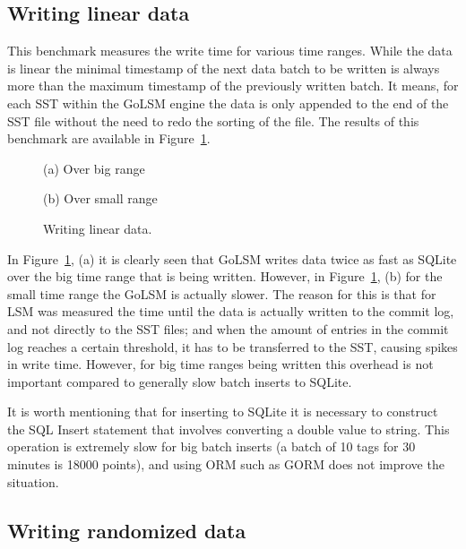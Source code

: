 \subsection{Writing linear data}

This benchmark measures the write time for various time ranges. While the data is linear the minimal timestamp of the next data batch to be written is always more than the maximum timestamp of the previously written batch. It means, for each SST within the GoLSM engine the data is only appended to the end of the SST file without the need to redo the sorting of the file. The results of this benchmark are available in Figure~\ref{fig6}.

\begin{figure}[!htb]
	\begin{minipage}{0.48\textwidth}
		\centering
		\resizebox{\textwidth}{!}{%
			
		}
		\label{figure}{(a) Over big range}
	\end{minipage}\hfill
	\begin{minipage}{0.48\textwidth}
		\centering
		\resizebox{\textwidth}{!}{%
			
		}
		\label{figure}{(b) Over small range}
	\end{minipage}
	
	\caption{Writing linear data.}\label{fig6}
\end{figure}

In Figure~\ref{fig6}, (a) it is clearly seen that GoLSM writes data twice as fast as SQLite over the big time range that is being written.  However, in Figure~\ref{fig6}, (b) for the small time range the GoLSM is actually slower. The reason for this is that for LSM was measured the time until the data is actually written to the commit log, and not directly to the SST files; and when the amount of entries in the commit log reaches a certain threshold, it has to be transferred to the SST, causing spikes in write time. However, for big time ranges being written this overhead is not important compared to generally slow batch inserts to SQLite. 

It is worth mentioning that for inserting to SQLite it is necessary to construct the SQL Insert statement that involves converting a double value to string. This operation is extremely slow for big batch inserts (a batch of 10 tags for 30 minutes is 18000 points), and using ORM such as GORM does not improve the situation.

\subsection{Writing randomized data}

